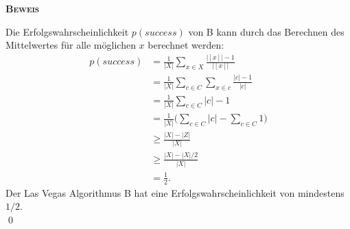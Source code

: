 \documentclass[12pt,a4paper]{scrartcl}
\numberwithin{equation}{section}
\numberwithin{myalgctr}{section}
\numberwithin{mytheoremctr}{section}
\newenvironment{myproof}{%
	\bigskip\noindent%
	\textsc{\textbf{Beweis}}%
	\indent
}{\par\bigskip}  %
\begin{document}
\begin{myproof}
	Die Erfolgswahrscheinlichkeit $p(success)$ von B kann durch das Berechnen des Mittelwertes für alle möglichen $x$ berechnet werden:
	\begin{align}
		p(success) &= \frac{1}{|X|}\sum_{x \in X}\frac{|[x]| - 1}{|[x]|}\\\nonumber
					&= \frac{1}{|X|}\sum_{c \in C}\sum_{x \in c}\frac{|c| - 1}{|c|}\\\nonumber
					&= \frac{1}{|X|}\sum_{c \in C}|c| - 1\\\nonumber
					&= \frac{1}{|X|}\Bigg(\sum_{c \in C}|c| - \sum_{c \in C}1\Bigg)\\\nonumber
					&\geq \frac{|X| - |Z|}{|X|}\\\nonumber
					&\geq \frac{|X| - |X|/2}{|X|}\\\nonumber
					&= \frac{1}{2}.
	\end{align}
	Der Las Vegas Algorithmus B hat eine Erfolgswahrscheinlichkeit von mindestens $1/2$.\\
	\qed
\end{myproof}

	\newpage
\end{document}
